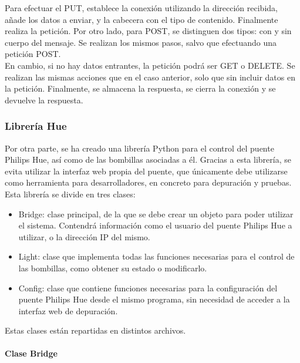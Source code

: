        Para efectuar el PUT, establece la conexión utilizando la dirección recibida, añade los datos a enviar, y la cabecera con el tipo de contenido. Finalmente realiza la petición. Por otro lado, para POST, se distinguen dos tipos: con y sin cuerpo del mensaje. Se realizan los mismos pasos, salvo que efectuando una petición POST. \\

        En cambio, si no hay datos entrantes, la petición podrá ser GET o DELETE. Se realizan las mismas acciones que en el caso anterior, solo que sin incluir datos en la petición. Finalmente, se almacena la respuesta, se cierra la conexión y se devuelve la respuesta. \\

        \subsubsection{Librería Hue}

        Por otra parte, se ha creado una librería Python para el control del puente Philips Hue, así como de las bombillas asociadas a él. Gracias a esta librería, se evita utilizar la interfaz web propia del puente, que únicamente debe utilizarse como herramienta para desarrolladores, en concreto para depuración y pruebas. Esta librería se divide en tres clases:
        \begin{itemize}
            \item Bridge: clase principal, de la que se debe crear un objeto para poder utilizar el sistema. Contendrá información como el usuario del puente Philips Hue a utilizar, o la dirección IP del mismo.
            \item Light: clase que implementa todas las funciones necesarias para el control de las bombillas, como obtener su estado o modificarlo.
            \item Config: clase que contiene funciones necesarias para la configuración del puente Philips Hue desde el mismo programa, sin necesidad de acceder a la interfaz web de depuración.
        \end{itemize}

        Estas clases están repartidas en distintos archivos.

        \paragraph{Clase Bridge}\mbox{}\\

